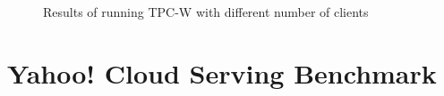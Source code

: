 \begin{figure}[!ht]
  \begin{center}\end{center}
  \begin{center}\end{center}
  \label{fig:tpcw10}
  \caption{Results of running TPC-W with different number of clients}
\end{figure}
 

\section{Yahoo! Cloud Serving Benchmark}

